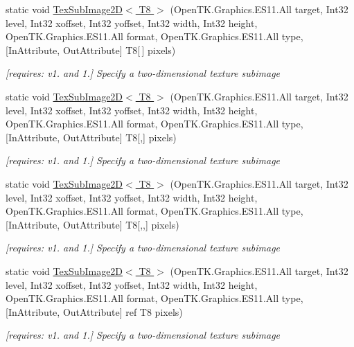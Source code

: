 \begin{DoxyCompactItemize}
static void \hyperlink{class_open_t_k_1_1_graphics_1_1_e_s11_1_1_g_l_ad0b42155dd2c331f3d873bd754c70c9f}{Tex\-Sub\-Image2\-D$<$ T8 $>$} (Open\-T\-K.\-Graphics.\-E\-S11.\-All target, Int32 level, Int32 xoffset, Int32 yoffset, Int32 width, Int32 height, Open\-T\-K.\-Graphics.\-E\-S11.\-All format, Open\-T\-K.\-Graphics.\-E\-S11.\-All type, \mbox{[}In\-Attribute, Out\-Attribute\mbox{]} T8\mbox{[}$\,$\mbox{]} pixels)
\begin{DoxyCompactList}\small\item\em \mbox{[}requires\-: v1. and 1.\mbox{]} Specify a two-\/dimensional texture subimage \end{DoxyCompactList}\item 
static void \hyperlink{class_open_t_k_1_1_graphics_1_1_e_s11_1_1_g_l_a00b2608439563a9fb29ab153e8eca594}{Tex\-Sub\-Image2\-D$<$ T8 $>$} (Open\-T\-K.\-Graphics.\-E\-S11.\-All target, Int32 level, Int32 xoffset, Int32 yoffset, Int32 width, Int32 height, Open\-T\-K.\-Graphics.\-E\-S11.\-All format, Open\-T\-K.\-Graphics.\-E\-S11.\-All type, \mbox{[}In\-Attribute, Out\-Attribute\mbox{]} T8\mbox{[},\mbox{]} pixels)
\begin{DoxyCompactList}\small\item\em \mbox{[}requires\-: v1. and 1.\mbox{]} Specify a two-\/dimensional texture subimage \end{DoxyCompactList}\item 
static void \hyperlink{class_open_t_k_1_1_graphics_1_1_e_s11_1_1_g_l_a33c6c882cff096104981bd0717a00937}{Tex\-Sub\-Image2\-D$<$ T8 $>$} (Open\-T\-K.\-Graphics.\-E\-S11.\-All target, Int32 level, Int32 xoffset, Int32 yoffset, Int32 width, Int32 height, Open\-T\-K.\-Graphics.\-E\-S11.\-All format, Open\-T\-K.\-Graphics.\-E\-S11.\-All type, \mbox{[}In\-Attribute, Out\-Attribute\mbox{]} T8\mbox{[},,\mbox{]} pixels)
\begin{DoxyCompactList}\small\item\em \mbox{[}requires\-: v1. and 1.\mbox{]} Specify a two-\/dimensional texture subimage \end{DoxyCompactList}\item 
static void \hyperlink{class_open_t_k_1_1_graphics_1_1_e_s11_1_1_g_l_a7bee0d71f0e2f036350ab2853b456d22}{Tex\-Sub\-Image2\-D$<$ T8 $>$} (Open\-T\-K.\-Graphics.\-E\-S11.\-All target, Int32 level, Int32 xoffset, Int32 yoffset, Int32 width, Int32 height, Open\-T\-K.\-Graphics.\-E\-S11.\-All format, Open\-T\-K.\-Graphics.\-E\-S11.\-All type, \mbox{[}In\-Attribute, Out\-Attribute\mbox{]} ref T8 pixels)
\begin{DoxyCompactList}\small\item\em \mbox{[}requires\-: v1. and 1.\mbox{]} Specify a two-\/dimensional texture subimage \end{DoxyCompactList}\item 

\end{DoxyCompactItemize}
